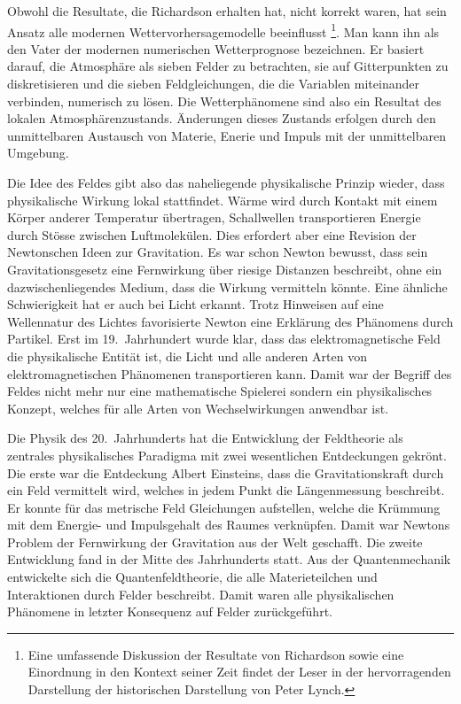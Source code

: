 Obwohl die Resultate, die Richardson erhalten hat, nicht korrekt waren,
hat sein Ansatz alle modernen Wettervorhersagemodelle beeinflusst%
\footnote{Eine umfassende Diskussion der Resultate von Richardson sowie
eine Einordnung in den Kontext seiner Zeit findet der Leser in der
hervorragenden Darstellung der historischen Darstellung \cite{buch:lynch}
von Peter Lynch.}.
Man kann ihn als den Vater der modernen numerischen Wetterprognose
bezeichnen.
Er basiert darauf, die Atmosphäre als sieben Felder zu betrachten,
sie auf Gitterpunkten zu diskretisieren und die sieben Feldgleichungen,
die die Variablen miteinander verbinden, numerisch zu lösen.
Die Wetterphänomene sind also ein Resultat des lokalen Atmosphärenzustands.
Änderungen dieses Zustands erfolgen durch den unmittelbaren Austausch
von Materie, Enerie und Impuls mit der unmittelbaren Umgebung.

Die Idee des Feldes gibt also das naheliegende physikalische Prinzip
wieder, dass physikalische Wirkung lokal stattfindet.
%
Wärme wird durch Kontakt mit einem Körper anderer Temperatur übertragen,
Schallwellen transportieren Energie durch Stösse zwischen Luftmolekülen.
%
Dies erfordert aber eine Revision der Newtonschen Ideen zur
Gravitation.
Es war schon Newton bewusst, dass sein Gravitationsgesetz eine 
Fernwirkung über riesige Distanzen beschreibt, ohne ein dazwischenliegendes
Medium, dass die Wirkung vermitteln könnte.
Eine ähnliche Schwierigkeit hat er auch bei Licht erkannt.
Trotz Hinweisen auf eine Wellennatur des Lichtes favorisierte Newton
eine Erklärung des Phänomens durch Partikel.
Erst im 19.~Jahrhundert wurde klar, dass das elektromagnetische Feld
die physikalische Entität ist, die Licht und alle anderen Arten von
elektromagnetischen Phänomenen transportieren kann.
Damit war der Begriff des Feldes nicht mehr nur eine mathematische
Spielerei sondern ein physikalisches Konzept, welches für alle Arten
von Wechselwirkungen anwendbar ist.

Die Physik des 20.~Jahrhunderts hat die Entwicklung der Feldtheorie als
zentrales physikalisches Paradigma mit zwei wesentlichen Entdeckungen
gekrönt.
Die erste war die Entdeckung Albert Einsteins, dass die Gravitationskraft
%
durch ein Feld vermittelt wird, welches in jedem Punkt die Längenmessung
beschreibt.
Er konnte für das metrische Feld Gleichungen aufstellen, welche die
Krümmung mit dem Energie- und Impulsgehalt des Raumes verknüpfen.
%
Damit war Newtons Problem der Fernwirkung der Gravitation aus der Welt
geschafft.
Die zweite Entwicklung fand in der Mitte des Jahrhunderts statt.
Aus der Quantenmechanik entwickelte sich die Quantenfeldtheorie, die
alle Materieteilchen und Interaktionen durch Felder beschreibt.
Damit waren alle physikalischen Phänomene in letzter Konsequenz auf
Felder zurückgeführt.

